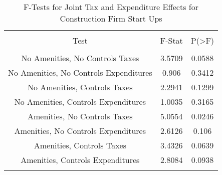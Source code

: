 
\begin{table}[!htbp] \centering 
  \caption{F-Tests for Joint Tax and Expenditure Effects for Construction Firm Start Ups} 
  \label{23Ftests} 
\begin{tabular}{@{\extracolsep{5pt}} ccc} 
\\[-1.8ex]\hline 
\hline \\[-1.8ex] 
Test & F-Stat & P(\textgreater F) \\ 
\hline \\[-1.8ex] 
No Amenities, No Controls Taxes & 3.5709 & 0.0588 \\ 
No Amenities, No Controls Expenditures & 0.906 & 0.3412 \\ 
No Amenities, Controls Taxes & 2.2941 & 0.1299 \\ 
No Amenities, Controls Expenditures & 1.0035 & 0.3165 \\ 
Amenities, No Controls Taxes & 5.0554 & 0.0246 \\ 
Amenities, No Controls Expenditures & 2.6126 & 0.106 \\ 
Amenities, Controls Taxes & 3.4326 & 0.0639 \\ 
Amenities, Controls Expenditures & 2.8084 & 0.0938 \\ 
\hline \\[-1.8ex] 
\end{tabular} 
\end{table} 
